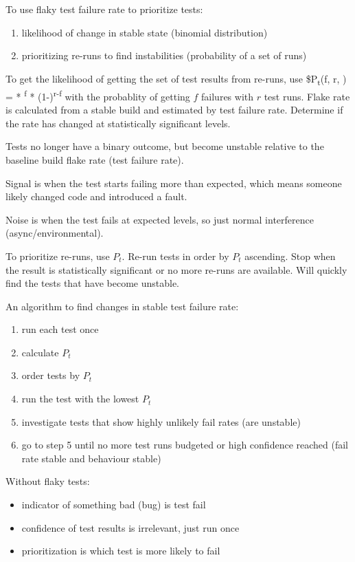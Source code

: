 \documentclass[11pt]{article}
\begin{document}
To use flaky test failure rate to prioritize tests:
\begin{enumerate}
\item likelihood of change in stable state (binomial distribution)
\item prioritizing re-runs to find instabilities (probability of a set of runs)
\end{enumerate}

To get the likelihood of getting the set of test results from re-runs, use
\$P\textsubscript{t}(f, r, ) =  * \textsuperscript{f} * (1-)\textsuperscript{r-f}
with the probablity of getting \(f\) failures with \(r\) test runs.
Flake rate is calculated from a stable build and estimated by test failure rate.
Determine if the rate has changed at statistically significant levels.

Tests no longer have a binary outcome, but become unstable relative to the baseline build flake rate
(test failure rate).

Signal is when the test starts failing more than expected, which means someone likely changed code and
introduced a fault.

Noise is when the test fails at expected levels, so just normal interference (async/environmental).

To prioritize re-runs, use \(P_{t}\).
Re-run tests in order by \(P_{t}\) ascending.
Stop when the result is statistically significant or no more re-runs are available.
Will quickly find the tests that have become unstable.

An algorithm to find changes in stable test failure rate:
\begin{enumerate}
\item run each test once
\item calculate \(P_{t}\)
\item order tests by \(P_{t}\)
\item run the test with the lowest \(P_{t}\)
\item investigate tests that show highly unlikely fail rates (are unstable)
\item go to step 5 until no more test runs budgeted or high confidence reached (fail rate stable and
behaviour stable)
\end{enumerate}

Without flaky tests:
\begin{itemize}
\item indicator of something bad (bug) is test fail
\item confidence of test results is irrelevant, just run once
\item prioritization is which test is more likely to fail
\end{itemize}
\end{document}
